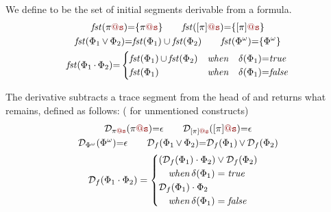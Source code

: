 {
\begin{definition}[First]\label{First1}
We define  to be the set of 
initial segments derivable from a   
\code{\effect} formula. 
{
\vspace{-1mm}
\begin{gather*} 
 \m{fst}(\pi\loc{@s}) {=} \{ \pi\loc{@s}\}
\qquad
 \m{fst}([\pi]\loc{@s}) {=} \{ [\pi]\loc{@s}\}
\\
\m{fst}(\effect_1 {\,\vee\,} \effect_2) {=} \m{fst}({\effect_1}) \cup \m{fst}({\effect_2}) 
\qquad
\m{fst}(\effect^\omega) {=} \{ \effect^\omega \}
\\ 
\m{fst}(\effect_1 {\,\cdot\,} \effect_2) {=} 
\begin{cases}
\m{fst}({\effect_1}) \,{\cup}\, \m{fst}({\effect_2}) & \m{when}\quad  \delta(\effect_1) {=} \m{true}
\\
\m{fst}(\effect_1) & \m{when}\quad  \delta(\effect_1) {=} \m{false}
\end{cases} 
\end{gather*}
}
\end{definition}}




{
\begin{definition}[Derivative]\label{Derivative}
The derivative 
subtracts a trace segment  from the head of \code{\effect} and returns what remains, %
defined as follows: 
({\code{\bot} for unmentioned constructs})
{
\vspace{-1mm}
\begin{gather*}
\deri_{\pi\loc{@s}}(\pi\loc{@s})  {=} \epsilon 
\qquad 
\deri_{[\pi]\loc{@s}}([\pi]\loc{@s})  {=} \epsilon 
\\ 
\deri_{\effect^\omega}(\effect^\omega)  {=} \epsilon
\qquad
\deri_{f}(\effect_1 {\,\vee\,} \effect_2) {=}
\deri_{f}(\effect_1) {\,\vee\,} \deri_{f}(\effect_2) 
\\
\deri_{f}(\effect_1 \cdot \effect_2) =
\begin{cases}
    (\deri_{f}(\effect_1) \cdot \effect_2) \vee \deri_{f}(\effect_2) \\
    \quad \m{when}\, \delta(\effect_1) = \m{true} \\
    \deri_{f}(\effect_1) \cdot \effect_2 \\
    \quad \m{when}\, \delta(\effect_1) = \m{false}
\end{cases}
\\[-1.2em]
\end{gather*}}

\end{definition}}

